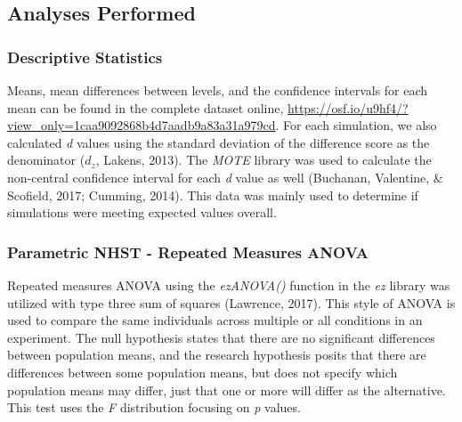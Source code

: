 \documentclass[,man, mask]{apa6}
\theoremstyle{definition}
\theoremstyle{definition}
\theoremstyle{definition}
\theoremstyle{remark}
\begin{document}
\subsection{Analyses Performed}\label{analyses-performed}

\subsubsection{Descriptive Statistics}\label{descriptive-statistics}

Means, mean differences between levels, and the confidence intervals for
each mean can be found in the complete dataset online,
\url{https://osf.io/u9hf4/?view_only=1caa9092868b4d7aadb9a83a31a979cd}.
For each simulation, we also calculated \emph{d} values using the
standard deviation of the difference score as the denominator
(\(d_{z}\), Lakens, 2013). The \emph{MOTE} library was used to calculate
the non-central confidence interval for each \emph{d} value as well
(Buchanan, Valentine, \& Scofield, 2017; Cumming, 2014). This data was
mainly used to determine if simulations were meeting expected values
overall.

\subsubsection{Parametric NHST - Repeated Measures
ANOVA}\label{parametric-nhst---repeated-measures-anova}

Repeated measures ANOVA using the \emph{ezANOVA()} function in the
\emph{ez} library was utilized with type three sum of squares (Lawrence,
2017). This style of ANOVA is used to compare the same individuals
across multiple or all conditions in an experiment. The null hypothesis
states that there are no significant differences between population
means, and the research hypothesis posits that there are differences
between some population means, but does not specify which population
means may differ, just that one or more will differ as the alternative.
This test uses the \emph{F} distribution focusing on \emph{p} values.
\end{document}
